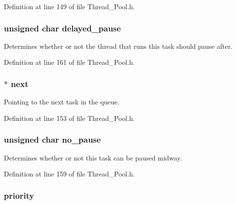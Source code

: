 Definition at line 149 of file Thread\+\_\+\+Pool.\+h.

\hypertarget{struct_task_a9a343e286620218fe1675a782196f647}{}
\subsubsection[{delayed\+\_\+pause}]{\setlength{\rightskip}{0pt plus 5cm}unsigned char delayed\+\_\+pause}\label{struct_task_a9a343e286620218fe1675a782196f647}


Determines whether or not the thread that runs this task should pause after. 



Definition at line 161 of file Thread\+\_\+\+Pool.\+h.

\hypertarget{struct_task_afc791d22abed6d81e714bb3993c31223}{}
\subsubsection[{next}]{$\ast$ next}\label{struct_task_afc791d22abed6d81e714bb3993c31223}


Pointing to the next task in the queue. 



Definition at line 153 of file Thread\+\_\+\+Pool.\+h.

\hypertarget{struct_task_ac11c21efa7d7fd20a420bc7bb9636765}{}
\subsubsection[{no\+\_\+pause}]{\setlength{\rightskip}{0pt plus 5cm}unsigned char no\+\_\+pause}\label{struct_task_ac11c21efa7d7fd20a420bc7bb9636765}


Determines whether or not this task can be paused midway. 



Definition at line 159 of file Thread\+\_\+\+Pool.\+h.

\hypertarget{struct_task_a417d879c9e171360ff9bcaef858fef6a}{}
\subsubsection[{priority}]{ priority}\label{struct_task_a417d879c9e171360ff9bcaef858fef6a}


